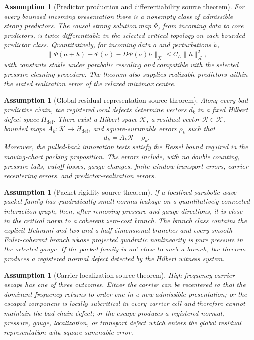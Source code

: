\documentclass[11pt]{article}
\newtheorem{assumption}[theorem]{Assumption}
\begin{document}
\begin{assumption}[Predictor production and differentiability source theorem]
For every bounded incoming presentation there is a nonempty class of admissible
strong predictors.  The causal strong solution map \(\Phi\), from incoming data
to core predictors, is twice differentiable in the selected critical topology on
each bounded predictor class.  Quantitatively, for incoming data \(a\) and
perturbations \(h\),
\[
\|\Phi(a+h)-\Phi(a)-D\Phi(a)h\|_X
\le
C_L\|h\|_{\mathcal A}^2,
\]
with constants stable under parabolic rescaling and compatible with the selected
pressure-cleaning procedure.  The theorem also supplies realizable predictors
within the stated realization error of the relaxed minimax centre.
\end{assumption}

\begin{assumption}[Global residual representation source theorem]
Along every bad predictive chain, the registered local defects determine vectors
\(d_k\) in a fixed Hilbert defect space \(H_{\mathrm{def}}\).  There exist a
Hilbert space \(\mathcal K\), a residual vector \(\mathcal R\in\mathcal K\),
bounded maps \(A_k:\mathcal K\to H_{\mathrm{def}}\), and square-summable errors
\(\rho_k\) such that
\[
d_k=A_k\mathcal R+\rho_k.
\]
Moreover, the pulled-back innovation tests satisfy the Bessel bound required in
the moving-chart packing proposition.  The errors include, with no double
counting, pressure tails, cutoff losses, gauge changes, finite-window transport
errors, carrier recentering errors, and predictor-realization errors.
\end{assumption}

\begin{assumption}[Packet rigidity source theorem]
If a localized parabolic wave-packet family has quadratically small normal
leakage on a quantitatively connected interaction graph, then, after removing
pressure and gauge directions, it is close in the critical norm to a coherent
zero-cost branch.  The branch class contains the explicit Beltrami and
two-and-a-half-dimensional branches and every smooth Euler-coherent branch whose
projected quadratic nonlinearity is pure pressure in the selected gauge.  If the
packet family is not close to such a branch, the theorem produces a registered
normal defect detected by the Hilbert witness system.
\end{assumption}

\begin{assumption}[Carrier localization source theorem]
High-frequency carrier escape has one of three outcomes.  Either the carrier can
be recentered so that the dominant frequency returns to order one in a new
admissible presentation; or the escaped component is locally subcritical in every
carrier cell and therefore cannot maintain the bad-chain defect; or the escape
produces a registered normal, pressure, gauge, localization, or transport defect
which enters the global residual representation with square-summable error.
\end{assumption}
\end{document}
